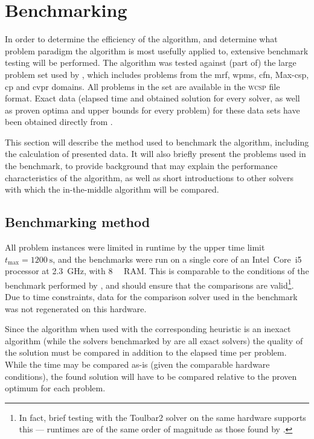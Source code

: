 \section{Benchmarking}
In order to determine the efficiency of the algorithm, and determine what problem paradigm the algorithm is most usefully applied to, extensive benchmark testing will be performed.
The algorithm was tested against (part of) the large problem set used by \textcite{deGivry14}, which includes problems from the \gls{mrf}, \gls{wpms}, \gls{cfn}, Max-\gls{csp}, \gls{cp} and \gls{cvpr} domains.
All problems in the set are available in the \textsc{wcsp} file format.
Exact data (elapsed time and obtained solution for every solver, as well as proven optima and upper bounds for every problem) for these data sets have been obtained directly from \citeauthor{deGivry14}.

This section will describe the method used to benchmark the algorithm, including the calculation of presented data.
It will also briefly present the problems used in the benchmark, to provide background that may explain the performance characteristics of the algorithm, as well as short introductions to other solvers with which the in-the-middle algorithm will be compared.

\subsection{Benchmarking method}
All problem instances were limited in runtime by the upper time limit \(t_{\text{max}} = \SI{1200}{\second}\), and the benchmarks were run on a single core of an Intel~Core~i5 processor at \SI{2.3}{\giga\hertz}, with \SI{8}{\gibi\byte} RAM.
This is comparable to the conditions of the benchmark performed by \textcite{deGivry14}, and should ensure that the comparisons are valid\footnote{In fact, brief testing with the Toulbar2 solver on the same hardware supports this --- runtimes are of the same order of magnitude as those found by \textcite{deGivry14}.}.
Due to time constraints, data for the comparison solver used in the benchmark was not regenerated on this hardware.

Since the algorithm when used with the corresponding heuristic is an inexact algorithm (while the solvers benchmarked by \textcite{deGivry14} are all exact solvers) the quality of the solution must be compared in addition to the elapsed time per problem.
While the time may be compared as-is (given the comparable hardware conditions), the found solution will have to be compared relative to the proven optimum for each problem.


